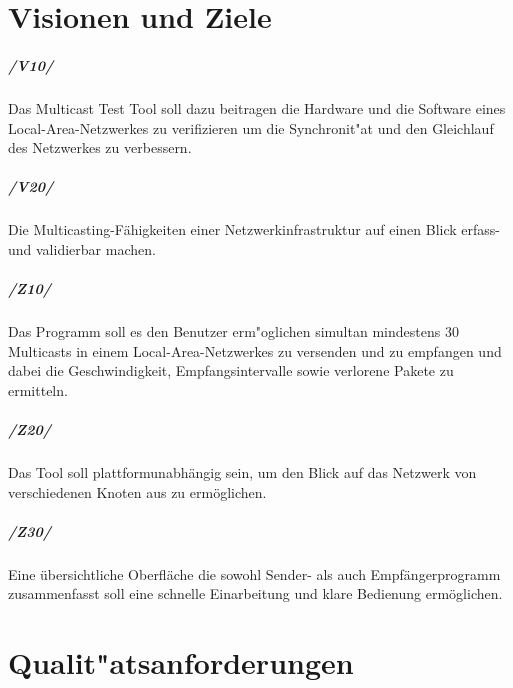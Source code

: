 \chapter{Visionen und Ziele}
\label{cha:visi}

\paragraph{/V10/} Das Multicast Test Tool soll dazu beitragen die Hardware und
die Software eines Local-Area-Netzwerkes zu verifizieren um die Synchronit"at
und den Gleichlauf des Netzwerkes zu verbessern.

\paragraph{/V20/} Die Multicasting-Fähigkeiten einer Netzwerkinfrastruktur auf
einen Blick erfass- und validierbar machen.

\paragraph{/Z10/} Das Programm soll es den Benutzer erm"oglichen simultan
mindestens 30 Multicasts in einem Local-Area-Netzwerkes zu versenden und zu
empfangen und dabei die Geschwindigkeit, Empfangsintervalle sowie verlorene Pakete zu ermitteln.

\paragraph{/Z20/} Das Tool soll plattformunabhängig sein, um den Blick auf das
Netzwerk von verschiedenen Knoten aus zu ermöglichen.

\paragraph{/Z30/} Eine übersichtliche Oberfläche die sowohl Sender- als auch
Empfängerprogramm zusammenfasst soll eine schnelle Einarbeitung und klare
Bedienung ermöglichen.







\chapter{Qualit"atsanforderungen}
\label{cha:qual}

